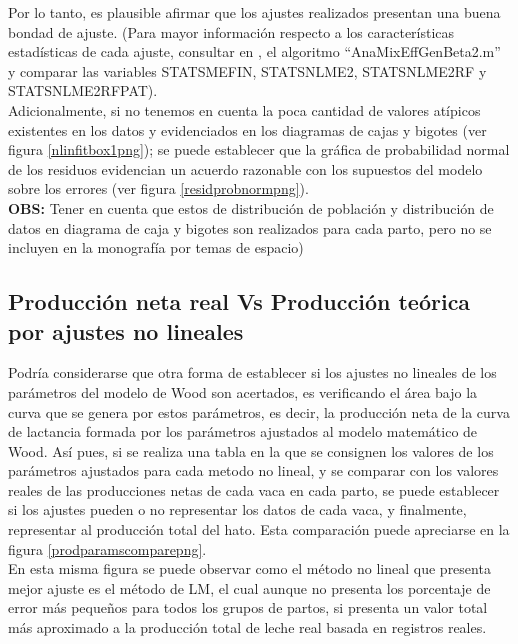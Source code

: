 Por lo tanto, es plausible afirmar que los ajustes realizados presentan una buena bondad de ajuste. (Para mayor información respecto a los características estadísticas de cada ajuste, consultar en \cite{msclfggrepo}, el algoritmo ``AnaMixEffGenBeta2.m'' y comparar las variables STATSMEFIN, STATSNLME2, STATSNLME2RF y STATSNLME2RFPAT). \\

Adicionalmente, si no tenemos en cuenta la poca cantidad de valores atípicos existentes en los datos y evidenciados en los diagramas de cajas y bigotes (ver figura \ref{nlinfitbox1png}); se puede establecer que la gráfica de probabilidad normal de los residuos evidencian un acuerdo razonable con los supuestos del modelo sobre los errores (ver figura \ref{residprobnormpng}).\\

\textbf{OBS: } Tener en cuenta que estos de distribución de población y distribución de datos en diagrama de caja y bigotes son realizados para cada parto, pero no se incluyen en la monografía por temas de espacio)

\subsection{Producción neta real Vs Producción teórica por ajustes no lineales}

Podría considerarse que otra forma de establecer si los ajustes no lineales de los parámetros del modelo de Wood son acertados, es verificando el área bajo la curva que se genera por estos parámetros, es decir, la producción neta de la curva de lactancia formada por los parámetros ajustados al modelo matemático de Wood. Así pues, si se realiza una tabla en la que se consignen los valores de los parámetros ajustados para cada metodo no lineal, y se comparar con los valores reales de las producciones netas de cada vaca en cada parto, se puede establecer si los ajustes pueden o no representar los datos de cada vaca, y finalmente, representar al producción total del hato. Esta comparación puede apreciarse en la figura \ref{prodparamscomparepng}.\\

En esta misma figura se puede observar como el método no lineal que presenta mejor ajuste es el método de LM, el cual aunque no presenta los porcentaje de error más pequeños para todos los grupos de partos, si presenta un valor total más aproximado a la producción total de leche real basada en registros reales.



